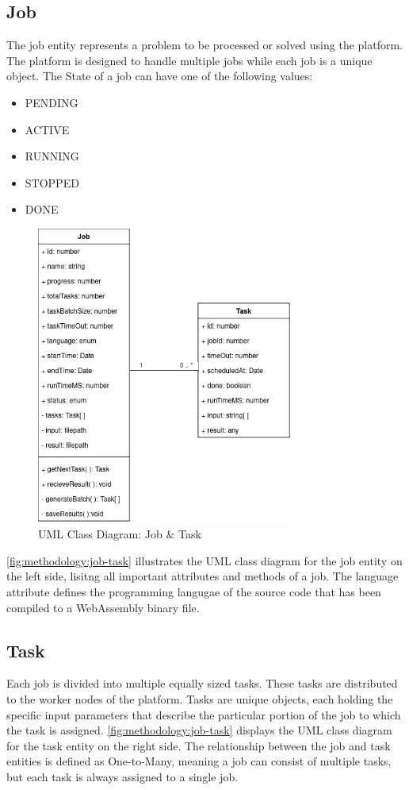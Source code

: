 \subsection{Job}
\label{subsec:methodology:entities:job}
The job entity represents a problem to be processed or solved using the platform. The platform is designed to handle multiple jobs while each job is a unique object. The State of a job can have one of the following values:
\begin{itemize}
  \item PENDING
  \item ACTIVE
  \item RUNNING
  \item STOPPED
  \item DONE
\end{itemize}
\begin{figure}[htbp]
  \centering
  \includegraphics[width=0.75\textwidth]{gfx/figures/Job-Task.png}
  \caption{\acs{UML} Class Diagram: Job \& Task}
  \label{fig:methodology:job-task}
\end{figure}
\autoref{fig:methodology:job-task} illustrates the \ac{UML} class diagram for the job entity on the left side, lisitng all important attributes and methods of a job. The language attribute defines the programming langugae of the source code that has been compiled to a WebAssembly binary file.

\subsection{Task}
\label{subsec:methodology:entities:task}
Each job is divided into multiple equally sized tasks. These tasks are distributed to the worker nodes of the platform. Tasks are unique objects, each holding the specific input parameters that describe the particular portion of the job to which the task is assigned. \autoref{fig:methodology:job-task} displays the \ac{UML} class diagram for the task entity on the right side. The relationship between the job and task entities is defined as One-to-Many, meaning a job can consist of multiple tasks, but each task is always assigned to a single job.

